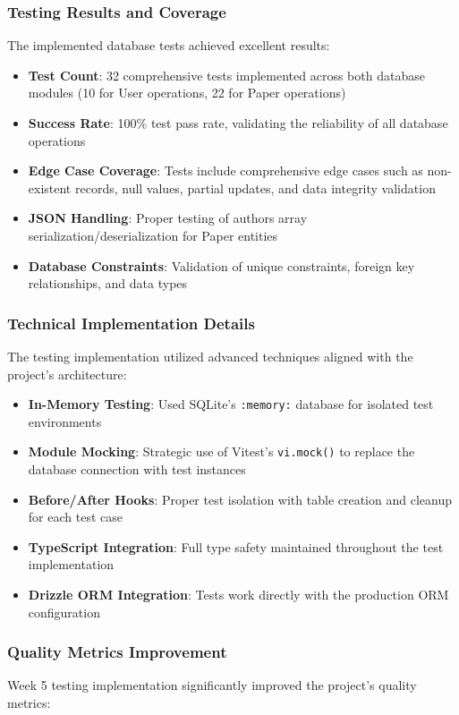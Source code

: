 \documentclass[12pt]{article}
\begin{document}
\subsubsection{Testing Results and Coverage}
The implemented database tests achieved excellent results:

\begin{itemize}
  \item \textbf{Test Count}: 32 comprehensive tests implemented across both database modules (10 for User operations, 22 for Paper operations)
  \item \textbf{Success Rate}: 100\% test pass rate, validating the reliability of all database operations
  \item \textbf{Edge Case Coverage}: Tests include comprehensive edge cases such as non-existent records, null values, partial updates, and data integrity validation
  \item \textbf{JSON Handling}: Proper testing of authors array serialization/deserialization for Paper entities
  \item \textbf{Database Constraints}: Validation of unique constraints, foreign key relationships, and data types
\end{itemize}

\subsubsection{Technical Implementation Details}
The testing implementation utilized advanced techniques aligned with the project's architecture:

\begin{itemize}
  \item \textbf{In-Memory Testing}: Used SQLite's \texttt{:memory:} database for isolated test environments
  \item \textbf{Module Mocking}: Strategic use of Vitest's \texttt{vi.mock()} to replace the database connection with test instances
  \item \textbf{Before/After Hooks}: Proper test isolation with table creation and cleanup for each test case
  \item \textbf{TypeScript Integration}: Full type safety maintained throughout the test implementation
  \item \textbf{Drizzle ORM Integration}: Tests work directly with the production ORM configuration
\end{itemize}

\subsubsection{Quality Metrics Improvement}
Week 5 testing implementation significantly improved the project's quality metrics:
\end{document}
